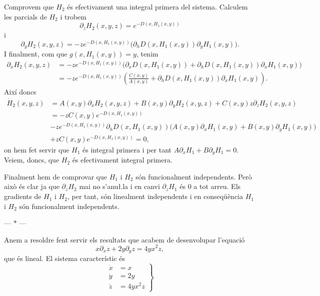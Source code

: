 \documentclass[12pt]{article}
\numberwithin{table}{section}
\numberwithin{equation}{section}
\numberwithin{figure}{section}
\newcommand{\parbreak}{
	\begin{center}
		--- $\ast$ ---
	\end{center} 
}
\begin{document}
Comprovem que \( H_2 \) és efectivament una integral primera del sistema. Calculem les parcials de \( H_2 \) i trobem
\begin{equation*}
	\partial_z H_2(x,y,z) = e^{-D(x,H_1(x,y))}
\end{equation*}
i
\begin{equation*}
	\partial_y H_2(x,y,z) = -ze^{-D(x,H_1(x,y))} \big(\partial_h D(x, H_1(x,y)) \partial_y H_1(x,y)\big).
\end{equation*}
I finalment, com que \( g(x, H_1(x,y)) = y \), tenim
\begin{align*}
	\partial_x H_2(x,y,z) & = -ze^{-D(x,H_1(x,y))} \big(\partial_x D(x,H_1(x,y)) + \partial_h D(x, H_1(x,y)) \partial_x H_1(x,y)\big) \\
												& = -ze^{-D(x,H_1(x,y))} \left(\frac{C(x,y)}{A(x,y)} + \partial_h D(x, H_1(x,y)) \partial_x H_1(x,y)\right).
\end{align*}
Així doncs
\begin{align*}
	\dot{H}_2(x,y,z) & = A(x,y)\partial_x H_2(x,y,z) + B(x,y)\partial_y H_2(x,y,z) + C(x,y)z\partial_z H_2(x,y,z) \\
									 & = -zC(x,y) e^{-D(x,H_1(x,y))} \\
									 & -z e^{-D(x,H_1(x,y))} \partial_h D(x, H_1(x,y)) \big( A(x,y) \partial_x H_1(x,y) + B(x,y) \partial_y H_1(x,y) \big) \\ 
									 & + zC(x,y) e^{-D(x,H_1(x,y))} = 0,
\end{align*}
on hem fet servir que \( H_1 \) és integral primera i per tant \( A\partial_xH_1 + B\partial_yH_1 = 0 \). Veiem, doncs, que \( H_2 \) és efectivament integral primera. 

Finalment hem de comprovar que \( H_1 \) i \( H_2 \) són funcionalment independents. Però això és clar ja que \( \partial_z H_2 \) mai no s'anu\l.la i en canvi \( \partial_z H_1 \) és 0 a tot arreu. Els gradients de \( H_1 \) i \( H_2 \), per tant, són linealment independents i en conseqüència \( H_1 \) i \( H_2 \) són funcionalment independents. 

\parbreak

Anem a resoldre fent servir els resultats que acabem de desenvolupar l'equació
\begin{equation*}
	x \partial_x z + 2y \partial_y z = 4yx^2 z,
\end{equation*}
que és lineal. El sistema característic és 
\begin{equation*}
	\left. 	
		\begin{aligned}
			\dot{x} & = x \\
			\dot{y} & = 2y \\
			\dot{z} & = 4yx^2z
		\end{aligned}
	\right\}
\end{equation*}
\end{document}

